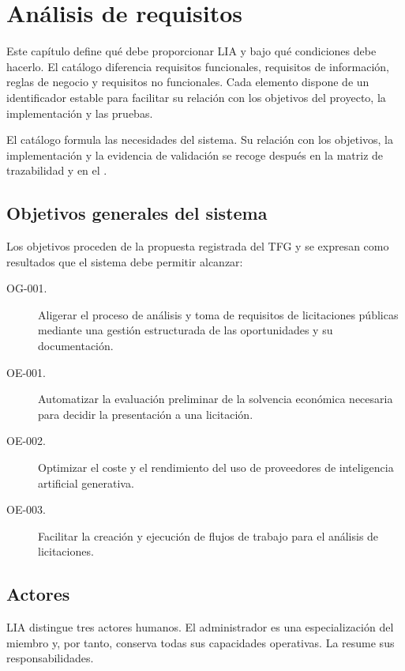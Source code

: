 \chapter{Análisis de requisitos}
\label{chap:requirements}

Este capítulo define qué debe proporcionar LIA y bajo qué condiciones debe
hacerlo. El catálogo diferencia requisitos funcionales, requisitos de
información, reglas de negocio y requisitos no funcionales. Cada elemento
dispone de un identificador estable para facilitar su relación con los objetivos
del proyecto, la implementación y las pruebas.

El catálogo formula las necesidades del sistema. Su relación con los objetivos,
la implementación y la evidencia de validación se recoge después en la matriz
de trazabilidad y en el .

\section{Objetivos generales del sistema}

Los objetivos proceden de la propuesta registrada del TFG y se expresan como
resultados que el sistema debe permitir alcanzar:

\begin{description}
  \item[OG-001.] Aligerar el proceso de análisis y toma de requisitos de
        licitaciones públicas mediante una gestión estructurada de las
        oportunidades y su documentación.
  \item[OE-001.] Automatizar la evaluación preliminar de la solvencia económica
        necesaria para decidir la presentación a una licitación.
  \item[OE-002.] Optimizar el coste y el rendimiento del uso de proveedores de
        inteligencia artificial generativa.
  \item[OE-003.] Facilitar la creación y ejecución de flujos de trabajo para el
        análisis de licitaciones.
\end{description}

\section{Actores}

LIA distingue tres actores humanos. El administrador es una especialización del
miembro y, por tanto, conserva todas sus capacidades operativas. La
 resume sus responsabilidades.

